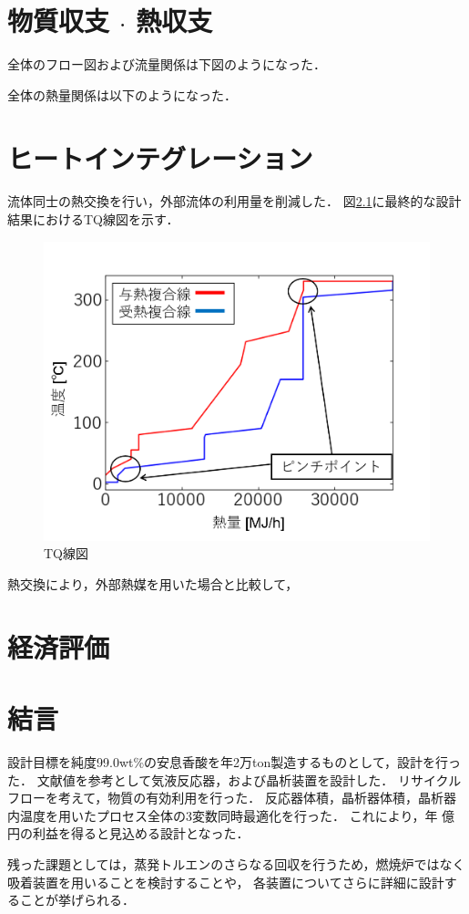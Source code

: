 \documentclass[a4j]{jsreport}
\begin{document}
\newpage
\chapter{物質収支 $\cdot$ 熱収支}
全体のフロー図および流量関係は下図のようになった．

全体の熱量関係は以下のようになった．

\newpage
\chapter{ヒートインテグレーション}
流体同士の熱交換を行い，外部流体の利用量を削減した．
図\ref{TQ線図}に最終的な設計結果におけるTQ線図を示す．
\begin{figure}[htbp]
    \label{TQ線図}
    \begin{center}
        \includegraphics[scale=0.7]{TQdiagram.png}
        \caption{TQ線図}
    \end{center}
\end{figure}

熱交換により，外部熱媒を用いた場合と比較して，

\newpage
\chapter{経済評価}

\newpage
\chapter{結言}
設計目標を純度99.0wt\%の安息香酸を年2万ton製造するものとして，設計を行った．
文献値を参考として気液反応器，および晶析装置を設計した．
リサイクルフローを考えて，物質の有効利用を行った．
反応器体積，晶析器体積，晶析器内温度を用いたプロセス全体の3変数同時最適化を行った．
これにより，年 億円の利益を得ると見込める設計となった．
\par
残った課題としては，蒸発トルエンのさらなる回収を行うため，燃焼炉ではなく吸着装置を用いることを検討することや，
各装置についてさらに詳細に設計することが挙げられる．
\end{document}
